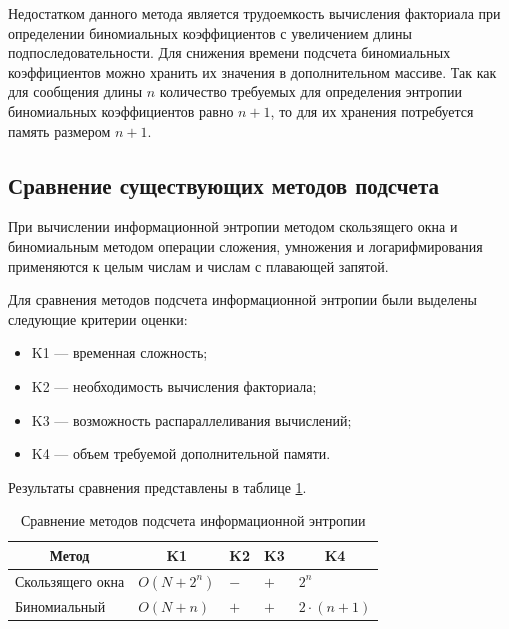 Недостатком данного метода является трудоемкость вычисления факториала при определении биномиальных коэффициентов с увеличением длины подпоследовательности. Для снижения времени подсчета биномиальных коэффициентов можно хранить их значения в дополнительном массиве. Так как для сообщения длины $n$ количество требуемых для определения энтропии биномиальных коэффициентов равно $n + 1$, то для их хранения потребуется память размером $n + 1$.

\subsection{Сравнение существующих методов подсчета}

При вычислении информационной энтропии методом скользящего окна и биномиальным методом операции сложения, умножения и логарифмирования применяются к целым числам и числам с плавающей запятой.

Для сравнения методов подсчета информационной энтропии были выделены следующие критерии оценки:

\begin{itemize}
	\item K1 --- временная сложность;
	\item K2 --- необходимость вычисления факториала;
	\item K3 --- возможность распараллеливания вычислений;
	\item K4 --- объем требуемой дополнительной памяти.
\end{itemize}

Результаты сравнения представлены в таблице \ref{tab:comparison}.

\begin{table}[h]
    \caption{Сравнение методов подсчета информационной энтропии}
    \begin{center}
        \begin{tabular}{|l|l|l|l|l|}
        		\hline
            \multicolumn{1}{|c}{\textbf{Метод}} & 
            \multicolumn{1}{|c|}{\textbf{K1}} &
            \multicolumn{1}{c|}{\textbf{K2}} &
            \multicolumn{1}{c|}{\textbf{K3}} & 
            \multicolumn{1}{c|}{\textbf{K4}} \\ \hline
            Скользящего окна &  $O(N + 2^n)$ & $-$ & $+$ & $2^n$ \\ \hline
            Биномиальный &  $O(N + n)$ & $+$ & $+$ & $2 \cdot (n + 1)$ \\ \hline
        \end{tabular}
    \end{center}
    \label{tab:comparison}
\end{table}

